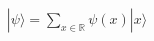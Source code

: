 \documentclass[preview]{standalone}
\begin{document}
\begin{align*}
|\psi\rangle = \sum_{x\in\mathbb{R}} \psi(x) |x\rangle
\end{align*}
\end{document}
